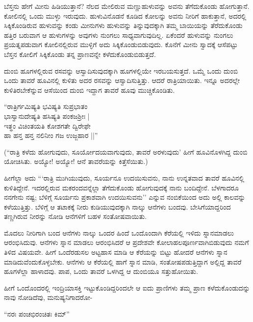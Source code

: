 ಬೆಸ್ತನು ಹೇಗೆ ಮೀನು ಹಿಡಿಯುತ್ತಾನೆ? ನೆಲದ ಮೇಲಿರುವ ಮಣ್ಣುಹುಳುವನ್ನು ಅವನು ತೆಗೆದುಕೊಂಡು ಹೋಗುತ್ತಾನೆ. ಕೋಲಿನಲ್ಲಿ ಒಂದು ಮುಳ್ಳು ಇರುವುದು. ಹುಳುವಿನೊಡನೆ ಕೂಡಿದ ಕೋಲನ್ನು ಅವನು ನೀರಿಗೆ ಹಾಕುತ್ತಾನೆ, ಅದರಲ್ಲಿ ಸಿಕ್ಕಿಕೊಂಡಿರುವ ಹುಳುವನ್ನು ಕಂಡು ಮೀನುಗಳು ಹುಳುವನ್ನು ತಿನ್ನುವುದಕ್ಕಾಗಿ ತಮ್ಮ ಬಾಯಿಯನ್ನು ತೆರೆದುಕೊಂಡು ಹತ್ತಿರ ಬರುವಾಗ ಆ ಹುಳುಗಳನ್ನು ಅವುಗಳು ನುಂಗಲು ಸಾಧ್ಯವಾಗುವುದಿಲ್ಲ. ಏಕೆಂದರೆ ಹುಳುವನ್ನು ನುಂಗಲು ಪ್ರಯತ್ನಪಡುವಾಗ ಕೋಲಿನಲ್ಲಿರುವ ಮುಳ್ಳಿಗೆ ಅದು ಸಿಕ್ಕಿಕೊಂಡುಬಿಡುವುದು. ಕೊನೆಗೆ ಮೀನು ಸ್ವಾದಕ್ಕೆ ಆಸೆಪಟ್ಟು ಬೆಸ್ತನ ಕೋಲಿಗೆ ಸಿಕ್ಕಿಕೊಂಡು ತನ್ನ ಪ್ರಾಣವನ್ನೇ ಕಳೆದುಕೊಂಡುಬಿಡುತ್ತದೆ.

ದುಂಬಿ ಹೂಗಳಲ್ಲಿರುವ ರಸವನ್ನು ಆಸ್ವಾದಿಸುವುದಕ್ಕಾಗಿ ಹೂಗಳಲ್ಲಿಯೇ ಇರಬಯಸುತ್ತದೆ. ಒಮ್ಮೆ ಒಂದು ದುಂಬಿ ಒಂದು ತಾವರೆ ಹೂವಿನಲ್ಲಿ ಕುಳಿತು ಅದರ ರಸವನ್ನು ಆಸ್ವಾದಿಸುತ್ತಿತ್ತು. ಆದರೆ ರಾತ್ರಿಯಾಯಿತು. ಇನ್ನೂ ಅದರಲ್ಲೇ ಕುಳಿತಿರಬೇಕೆನ್ನುವ ಆಸೆಯಿಂದ ದುಂಬಿ ಇದ್ದಾಗ ತಾವರೆ ಹೂವು ಮುಚ್ಚಿಕೊಂಡಿತು.

\begin{shloka}
``ರಾತ್ರಿರ್ಗಮಿಷ್ಯತಿ ಭವಿಷ್ಯತಿ ಸುಪ್ರಭಾತಂ\\
ಭಾಸ್ವಾನುದೇಷ್ಯತಿ ಹಸಿಷ್ಯತಿ ಪಂಕಜಶ್ರೀಃ‌ |\\
ಇತ್ಥಂ ವಿಚಿಂತಯತಿ ಕೋಶಗತೇ ದ್ವಿರೇಫೇ\\
ಹಾ ಹನ್ತ ಹನ್ತ ನಲಿನೀಂ ಗಜ ಉಜ್ಜಹಾರ ||''
\end{shloka}

(``ರಾತ್ರಿ ಕಳೆದು ಹೋಗುವುದು, ಸೂರ್ಯೋದಯವಾಗುವುದು, ತಾವರೆ ಅರಳುವುದು' ಹೀಗೆ ಹೂವಿನೊಳಗಿದ್ದ ದುಂಬಿ ಯೋಚಿಸಿತು. ಅಯ್ಯೋ! ಅಯ್ಯೋ! ಆನೆ ತಾವರೆಯನ್ನು ಕಿತ್ತೆಸೆಯಿತು.)

ಹೀಗೆಲ್ಲಾ ಅದು ```ರಾತ್ರಿ ಮುಗಿಯುವುದು, ಸೂರ್ಯನೂ ಉದಯಿಸುವನು, ನಾನು ಉನ್ನತವಾದ ತಾವರೆ ಹೂವಿನಲ್ಲಿ ಕುಳಿತಿದ್ದೇನೆ. ಇದರಲ್ಲಿರುವ ಮಕರಂದವನ್ನೆಲ್ಲಾ ತೆಗೆದುಕೊಂಡು ಹೋಗುವುದಕ್ಕೆ ನಾನು ಬಂದಿದ್ದೇನೆ. ಬೆಳಗಾದರೂ ನನಗೇನು ನಷ್ಟ; ಬೆಳಿಗ್ಗೆ ಸೂರ್ಯನು ಪ್ರಕಾಶವಾಗಿ ಉದಯಿಸುವನು'' ಎನ್ನುವ ನಂಬಿಕೆಯಿಂದ ಅದು ಅಲ್ಲಿ ಕಾಲವನ್ನು ಕಳೆಯುತ್ತಿತ್ತು. ಬೆಳಿಗ್ಗೆ ಆ ತಟಾಕಕ್ಕೆ ನೀರು ಕುಡಿಯುವುದಕ್ಕಾಗಿ ನಾಲ್ಕು ಆನೆಗಳು ಬಂದವು. ಬೇಸಿಗೆಯಾದ್ದರಿಂದ ತಣ್ಣಗಿರುವ ನೀರನ್ನು ನೋಡಿ ಆನೆಗಳಿಗೆ ಬಹಳ ಸಂತೋಷವಾಯಿತು.

ಮೊದಲು ನೀರಿಗಾಗಿ ಬಂದ ಆನೆಗಳು ನಾಲ್ಕು ಒಂದರ ಹಿಂದೆ ಒಂದೊಂದಾಗಿ ಕೆರೆಯಲ್ಲಿ ಇಳಿದು ಸ್ನಾನಮಾಡಲು ಆರಂಭಿಸಿದುವು. ಆನೆಗಳು ಸ್ನಾನ ಮಾಡಲು ಆರಂಭಿಸಿದರೆ ಆ ಪ್ರದೇಶವೇ ಕೋಲಾಹಲಪೂರ್ಣವಾಗಿಬಿಡುವುದು ನಮಗೆ ತಿಳಿದ ವಿಷಯವೇ. ಹೀಗೆ ಒಂದೆರಡುಸಲ ಅಟ್ಟಹಾಸ ಮಾಡಿ ಆ ಕೆರೆಯನ್ನು ಬಿಟ್ಟು ಹೋದರೆ ಆನೆಗಳು ಸ್ನಾನ ಮಾಡಿದುವೆಂದುಕೊಳ್ಳಬೇಕು. ಆನೆಗಳು ಆ ಕೆರೆಯಲ್ಲಿ ಹಾಗೆ ಸ್ನಾನ ಮಾಡಿ, ಸಂತೋಷಪಡುತ್ತಿದ್ದಾಗ ಅಲ್ಲಿದ್ದ ತಾವರೆ ಹೂಗಳೆಲ್ಲಾ ಹಾಳಾದವು. ಪಾಪ, ಒಂದು ತಾವರೆ ಒಳಗಿದ್ದ ಆ ದುಂಬಿಯೂ ಸತ್ತುಹೋಯಿತು.

ಹೀಗೆ ಒಂದೊಂದರಲ್ಲಿ ಇಂದ್ರಿಯಾಸಕ್ತಿ ಇಟ್ಟುಕೊಂಡಿದ್ದರಿಂದಲೇ ಆ ಐದು ಪ್ರಾಣಿಗಳು ತಮ್ಮ ಪ್ರಾಣ ಕಳೆದುಕೊಂಡುದನ್ನು ನಾವು ನೋಡಿದೆವು, ಮನುಷ್ಯನಿಗಾದರೋ-

\begin{shloka}
``ನರಃ ಪಂಚಭಿರಂಚಿತಃ ಕಿಮ್''
\end{shloka}

